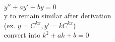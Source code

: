$y'' + ay' + by = 0$ \\
y to remain similar after derivation \\
(ex. $y = C^{kx}, y' = kC^{kx}$) \\
convert into $k^2 + ak + b = 0$